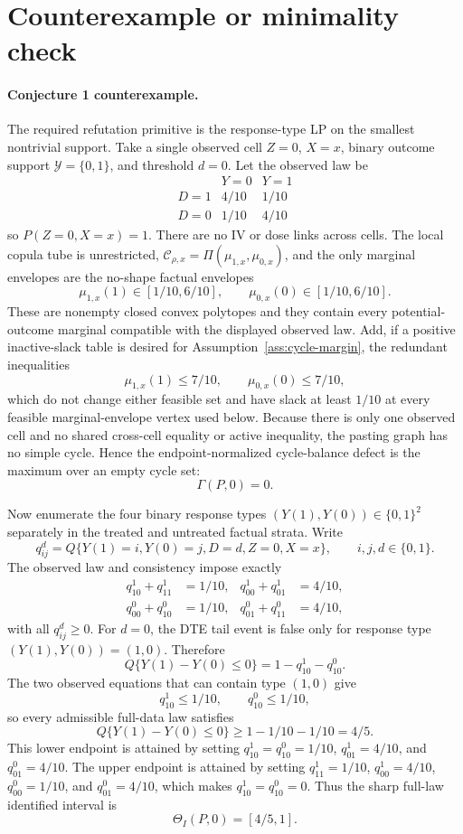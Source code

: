 \documentclass[11pt]{article}
\theoremstyle{definition}
\theoremstyle{plain}
\theoremstyle{remark}
\begin{document}
\section{Counterexample or minimality check}
\paragraph{Conjecture 1 counterexample.}
The required refutation primitive is the response-type LP on the smallest nontrivial support.  Take a single observed cell \(Z=0\), \(X=x\), binary outcome support \(\mathcal Y=\{0,1\}\), and threshold \(d=0\).  Let the observed law be
\[
\begin{array}{c|cc}
 & Y=0 & Y=1\\ \hline
D=1 & 4/10 & 1/10\\
D=0 & 1/10 & 4/10
\end{array}
\]
so \(P(Z=0,X=x)=1\).  There are no IV or dose links across cells.  The local copula tube is unrestricted, \(\mathcal C_{\rho,x}=\Pi(\mu_{1,x},\mu_{0,x})\), and the only marginal envelopes are the no-shape factual envelopes
\[
\mu_{1,x}(1)\in[1/10,6/10],
\qquad
\mu_{0,x}(0)\in[1/10,6/10].
\]
These are nonempty closed convex polytopes and they contain every potential-outcome marginal compatible with the displayed observed law.  Add, if a positive inactive-slack table is desired for Assumption~\ref{ass:cycle-margin}, the redundant inequalities
\[
\mu_{1,x}(1)\le 7/10,\qquad \mu_{0,x}(0)\le 7/10,
\]
which do not change either feasible set and have slack at least \(1/10\) at every feasible marginal-envelope vertex used below.  Because there is only one observed cell and no shared cross-cell equality or active inequality, the pasting graph has no simple cycle.  Hence the endpoint-normalized cycle-balance defect is the maximum over an empty cycle set:
\[
\Gamma(P,0)=0.
\]

Now enumerate the four binary response types \((Y(1),Y(0))\in\{0,1\}^2\) separately in the treated and untreated factual strata.  Write
\[
q^d_{ij}=Q\{Y(1)=i,Y(0)=j,D=d,Z=0,X=x\},
\qquad i,j,d\in\{0,1\}.
\]
The observed law and consistency impose exactly
\[
\begin{aligned}
q^1_{10}+q^1_{11}&=1/10, &
q^1_{00}+q^1_{01}&=4/10,\\
q^0_{00}+q^0_{10}&=1/10, &
q^0_{01}+q^0_{11}&=4/10,
\end{aligned}
\]
with all \(q^d_{ij}\ge0\).  For \(d=0\), the DTE tail event is false only for response type \((Y(1),Y(0))=(1,0)\).  Therefore
\[
Q\{Y(1)-Y(0)\le0\}=1-q^1_{10}-q^0_{10}.
\]
The two observed equations that can contain type \((1,0)\) give
\[
q^1_{10}\le 1/10,
\qquad
q^0_{10}\le 1/10,
\]
so every admissible full-data law satisfies
\[
Q\{Y(1)-Y(0)\le0\}\ge 1-1/10-1/10=4/5.
\]
This lower endpoint is attained by setting \(q^1_{10}=q^0_{10}=1/10\), \(q^1_{01}=4/10\), and \(q^0_{01}=4/10\).  The upper endpoint is attained by setting \(q^1_{11}=1/10\), \(q^1_{00}=4/10\), \(q^0_{00}=1/10\), and \(q^0_{01}=4/10\), which makes \(q^1_{10}=q^0_{10}=0\).  Thus the sharp full-law identified interval is
\[
\Theta_I(P,0)=[4/5,1].
\]
\end{document}
